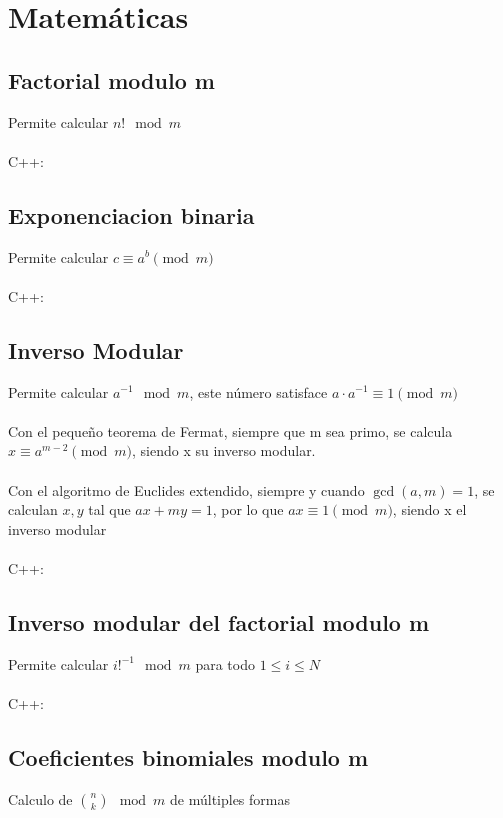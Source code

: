 \documentclass{article}
\begin{document}
\pagebreak
\section{Matemáticas}
    \subsection{Factorial modulo m}
        Permite calcular $n! \mod{m}$
        \\ \\
        C++:
        
    \subsection{Exponenciacion binaria}
        Permite calcular $c \equiv a^b\pmod{m}$
        \\ \\
        C++:
        

    \subsection{Inverso Modular}
        Permite calcular $ a^{-1} \mod{m}$, este número satisface $a \cdot a^{-1} \equiv 1 \pmod{m}$
        \\ \\
        Con el pequeño teorema de Fermat, siempre que m sea primo, se calcula $x \equiv a^{m - 2} \pmod{m}$, siendo x su inverso modular.
        \\ \\
        Con el algoritmo de Euclides extendido, siempre y cuando $\gcd(a, m) = 1$, se calculan $x, y$ tal que $ ax + my = 1$, por lo que
        $ax \equiv 1 \pmod{m}$, siendo x el inverso modular 
        \\ \\
        C++:
        
    \subsection{Inverso modular del factorial modulo m}
        Permite calcular $ i!^{-1} \mod{m}$ para todo $1 \leq i \leq N$
        \\ \\
        C++:
        
    \subsection{Coeficientes binomiales modulo m}
        Calculo de $\binom{n}{k} \mod{m}$ de múltiples formas
\end{document}

